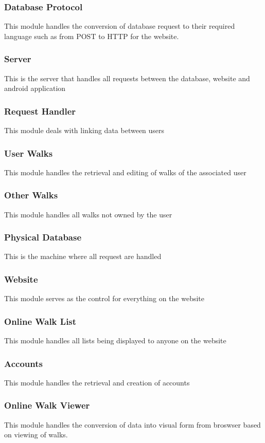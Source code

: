 \documentclass[12pt]{article}
\begin{document}
\subsubsection{Database Protocol}
This module handles the conversion of database request to their required language such as from POST to HTTP for the website.
\subsubsection{Server}
This is the server that handles all requests between the database, website and android application
\subsubsection{Request Handler}
This module deals with linking data between users

\subsubsection{User Walks}
This module handles the retrieval and editing of walks of the associated user

\subsubsection{Other Walks}
This module handles all walks not owned by the user

\subsubsection{Physical Database}
This is the machine where all request are handled

\subsubsection{Website}
This module serves as the control for everything on the website
\subsubsection{Online Walk List}
This module handles all lists being displayed to anyone on the website

\subsubsection{Accounts}
This module handles the retrieval and creation of accounts
\subsubsection{Online Walk Viewer}
This module handles the conversion of data into visual form from broswser based on viewing of walks.
\end{document}
